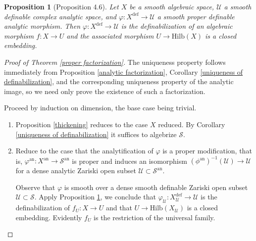 \documentclass{amsart}
\newtheorem{proposition}[theorem]{Proposition}
\theoremstyle{definition}
\numberwithin{equation}{section}
\newcommand{\definable}{\mathrm{def}}
\newcommand{\analytic}{\mathrm{an}}
\begin{document}
\begin{proposition}[Proposition 4.6] \label{embedding into Hilb}
  Let $X$ be a smooth algebraic space,
  $\mathcal{U}$ a smooth definable complex analytic space,
  and $\varphi: X^{\definable} \to \mathcal{U}$ a smooth proper definable analytic morphism.
  Then $\varphi: X^{\definable} \to \mathcal{U}$ is the definabilization of an algebraic morphism $f: X \to U$ and
  the associated morphism $U \to \mathrm{Hilb}(X)$ is a closed embedding.
\end{proposition}

\begin{proof}[Proof of Theorem \ref{proper factorization}]
  The uniqueness property follows immediately from Proposition \ref{analytic factorization}, Corollary \ref{uniqueness of definabilization},
  and the corresponding uniqueness property of the analytic image, so we need only prove the existence of such a factorization.

  Proceed by induction on dimension, the base case being trivial.
  \begin{enumerate}
    \item
    Proposition \ref{thickening} reduces to the case $X$ reduced.
    By Corollary \ref{uniqueness of definabilization} it suffices to algebrize $\mathcal{S}$.

    \item
    Reduce to the case that the analytification of $\varphi$ is a proper modification, that is,
    $\varphi^\analytic: X^\analytic \to \mathcal{S}^\analytic$ is proper and induces an isomorphism
    $(\phi^{\analytic})^{-1}(\mathcal{U})\to\mathcal{U}$ for a dense analytic Zariski open subset $\mathcal{U} \subset \mathcal{S}^{\analytic}$.

    Observe that $\varphi$ is smooth over a dense smooth definable Zariski open subset $\mathcal{U} \subset \mathcal{S}$.
    Apply Proposition \ref{embedding into Hilb}, we conclude that $\varphi_{\mathcal{U}} : X_{\mathcal{U}}^\definable \to \mathcal{U}$
    is the definabilization of $f_U: X \to U$ and that $U \to \mathrm{Hilb}(X_{\mathcal{U}})$ is a closed embedding.
    Evidently $f_U$ is the restriction of the universal family.


\end{enumerate}
\end{proof}
\end{document}
